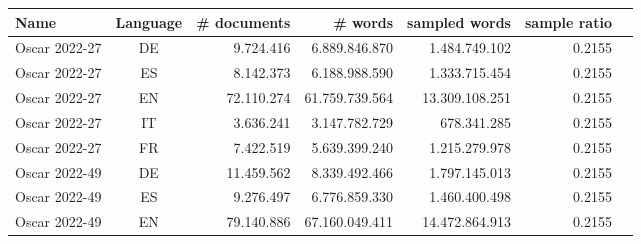 
\begin{table*}[tbh]
    \centering
    \begin{minipage}{0.9\textwidth}
    \small
    \begin{tabular}{lcrrrrr}
    \toprule
    Name & Language & \# documents & \# words & sampled words & sample ratio 
\\
\midrule
Oscar 2022-27 & DE %
& 9.724.416 & 6.889.846.870 %
& 1.484.749.102 & 0.2155
\\
Oscar 2022-27 & ES %
& 8.142.373 & 6.188.988.590 %
& 1.333.715.454 & 0.2155
\\
Oscar 2022-27 & EN %
& 72.110.274 & 61.759.739.564 %
& 13.309.108.251 & 0.2155
\\
Oscar 2022-27 & IT %
& 3.636.241 & 3.147.782.729 %
& 678.341.285 & 0.2155
\\
Oscar 2022-27 & FR %
& 7.422.519 & 5.639.399.240 %
& 1.215.279.978 & 0.2155
\\
Oscar 2022-49 & DE %
& 11.459.562 & 8.339.492.466 %
& 1.797.145.013 & 0.2155
\\
Oscar 2022-49 & ES %
& 9.276.497 & 6.776.859.330 %
& 1.460.400.498 & 0.2155
\\
Oscar 2022-49 & EN %
& 79.140.886 & 67.160.049.411 %
& 14.472.864.913 & 0.2155

\end{tabular}
\end{minipage}
\end{table*}

